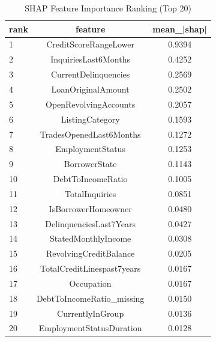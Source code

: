 \begin{table}
\centering
\caption{SHAP Feature Importance Ranking (Top 20)}
\label{tab:shap_ranking}
\begin{tabular}{lcc}
\toprule
rank & feature & mean_|shap| \\
\midrule
1 & CreditScoreRangeLower & 0.9394 \\
2 & InquiriesLast6Months & 0.4252 \\
3 & CurrentDelinquencies & 0.2569 \\
4 & LoanOriginalAmount & 0.2502 \\
5 & OpenRevolvingAccounts & 0.2057 \\
6 & ListingCategory & 0.1593 \\
7 & TradesOpenedLast6Months & 0.1272 \\
8 & EmploymentStatus & 0.1253 \\
9 & BorrowerState & 0.1143 \\
10 & DebtToIncomeRatio & 0.1005 \\
11 & TotalInquiries & 0.0851 \\
12 & IsBorrowerHomeowner & 0.0480 \\
13 & DelinquenciesLast7Years & 0.0427 \\
14 & StatedMonthlyIncome & 0.0308 \\
15 & RevolvingCreditBalance & 0.0205 \\
16 & TotalCreditLinespast7years & 0.0167 \\
17 & Occupation & 0.0167 \\
18 & DebtToIncomeRatio_missing & 0.0150 \\
19 & CurrentlyInGroup & 0.0136 \\
20 & EmploymentStatusDuration & 0.0128 \\
\bottomrule
\end{tabular}
\end{table}
